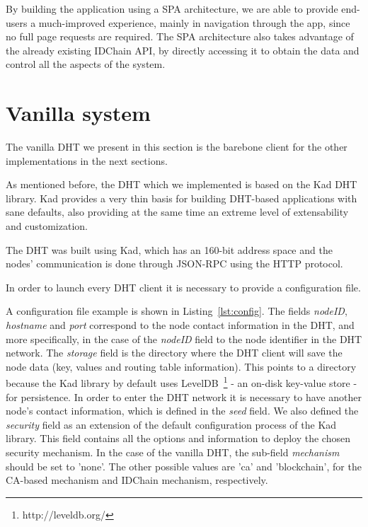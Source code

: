 By building the application using a SPA architecture, we are able to provide end-users a much-improved experience, mainly in navigation through the app, since no full page requests are required.
The \ac{SPA} architecture also takes advantage of the already existing IDChain API, by directly accessing it to obtain the data and control all the aspects of the system.

\section{Vanilla system}

The vanilla \ac{DHT} we present in this section is the barebone client for the other implementations in the next sections.

As mentioned before, the \ac{DHT} which we implemented is based on the Kad DHT library.
Kad provides a very thin basis for building DHT-based applications with sane defaults, also providing at the same time an extreme level of extensability and customization.

The DHT was built using Kad, which has an 160-bit address space and the nodes' communication is done through JSON-RPC using the \ac{HTTP} protocol.

In order to launch every DHT client it is necessary to provide a configuration file.



A configuration file example is shown in Listing~\ref{lst:config}.
The fields \textit{nodeID}, \textit{hostname} and \textit{port} correspond to the node contact information in the DHT, and more specifically, in the case of the \textit{nodeID} field to the node identifier in the DHT network.
The \textit{storage} field is the directory where the DHT client will save the node data (key, values and routing table information). This points to a directory because the Kad library by default uses LevelDB~\footnote{http://leveldb.org/} - an on-disk key-value store - for persistence.
In order to enter the DHT network it is necessary to have another node's contact information, which is defined in the \textit{seed} field.
We also defined the \textit{security} field as an extension of the default configuration process of the Kad library.
This field contains all the options and information to deploy the chosen security mechanism.
In the case of the vanilla DHT, the sub-field \textit{mechanism} should be set to 'none'.
The other possible values are 'ca' and 'blockchain', for the CA-based mechanism and IDChain mechanism, respectively.

